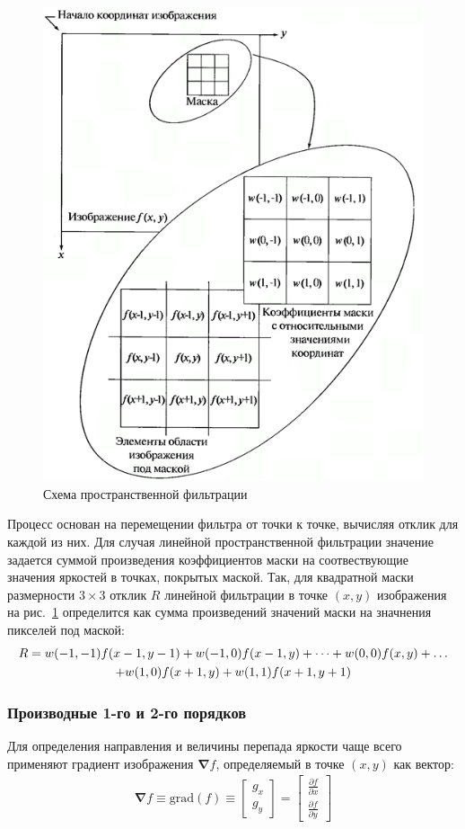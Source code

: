 \documentclass[12pt,a4paper]{article} %
\begin{document}
\begin{figure}[h]
	
	\centering
	
	\includegraphics[width=0.5\linewidth]{prost_filt.jpg}
	
	\caption{Схема пространственной фильтрации}
	
	\label{fig:prost_filt}
	
\end{figure}

\newpage

Процесс основан на перемещении фильтра от точки к точке, вычисляя отклик для каждой из них. Для случая линейной пространственной фильтрации значение задается суммой произведения коэффициентов маски на соотвествующие значения яркостей в точках, покрытых маской. Так, для квадратной маски размерности $3\times3$ отклик $R$ линейной фильтрации в точке $(x, y)$ изображения на рис.~\ref{fig:prost_filt} определится как сумма произведений значений маски на значнения пикселей под маской:
\begin{gather}\label{3.1}
R = w(-1,-1)f(x-1, y-1) + w(-1,0)f(x-1,y)+\dots +w(0,0)f(x,y)+\dots \notag\\
+ w(1,0)f(x+1, y)+w(1,1)f(x+1, y+1)
\end{gather}

\subsubsection{Производные 1-го и 2-го порядков}

Для определения направления и величины перепада яркости чаще всего применяют градиент изображения $\boldsymbol{\nabla}f$, определяемый в точке $(x,y)$ как вектор:
\begin{gather}\label{grad}
	\boldsymbol{\nabla}{f} \equiv \text{grad}(f)\equiv
	\begin{bmatrix} g_x \\ g_y \end{bmatrix}=
	\begin{bmatrix} \frac{\partial f}{\partial x} \\ \frac{\partial f}{\partial y}
	\end{bmatrix}
\end{gather}
\end{document}
